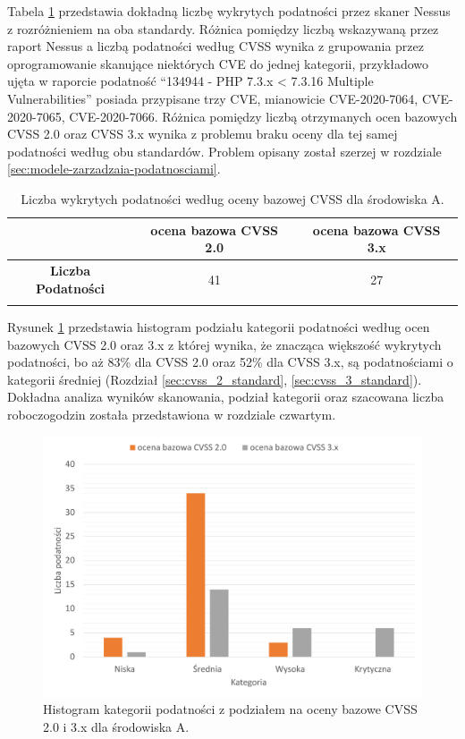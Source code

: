 \bigbreak
Tabela \ref{tab:chapter5:env_a:detected_vulns_nessus} przedstawia dokładną liczbę wykrytych podatności przez skaner Nessus z rozróżnieniem na oba standardy. Różnica pomiędzy liczbą wskazywaną przez raport Nessus a liczbą podatności według CVSS wynika z grupowania przez oprogramowanie skanujące niektórych CVE do jednej kategorii, przykładowo ujęta w raporcie podatność “134944 - PHP 7.3.x < 7.3.16 Multiple Vulnerabilities” posiada przypisane trzy CVE, mianowicie CVE-2020-7064, CVE-2020-7065, CVE-2020-7066. Różnica pomiędzy liczbą otrzymanych ocen bazowych CVSS 2.0 oraz CVSS 3.x wynika z problemu braku oceny dla tej samej podatności według obu standardów. Problem opisany został szerzej w rozdziale \ref{sec:modele-zarzadzaia-podatnosciami}.

\begin{table}[tbh]
\caption{Liczba wykrytych podatności według oceny bazowej CVSS dla środowiska A.}
\begin{center}
\label{tab:chapter5:env_a:detected_vulns_nessus}
\begin{tabular}{ccc}
\hline \noalign {\smallskip}
 & ocena bazowa CVSS 2.0 & ocena bazowa CVSS 3.x \\
\hline \noalign {\smallskip}
\textbf{Liczba Podatności}  &  41    & 27 \\
\hline \noalign {\smallskip}
\end{tabular}
\end{center}
\end{table}

\bigbreak
Rysunek \ref{fig:chapter5:env_a:env_stats} przedstawia histogram podziału kategorii podatności według ocen bazowych CVSS 2.0 oraz 3.x z której wynika, że znacząca większość wykrytych podatności, bo aż 83\% dla CVSS 2.0 oraz 52\% dla CVSS 3.x, są podatnościami o kategorii średniej (Rozdział \ref{sec:cvss_2_standard}, \ref{sec:cvss_3_standard}). Dokładna analiza wyników skanowania, podział kategorii oraz szacowana liczba roboczogodzin została przedstawiona w rozdziale czwartym.

\begin{figure}[!ht]
\centering
\includegraphics[width=.8\textwidth]{Chapters/Srodowiska/env_A/env_a_stats.pdf}
\caption{Histogram kategorii podatności z podziałem na oceny bazowe CVSS 2.0 i 3.x dla środowiska A.}
\label{fig:chapter5:env_a:env_stats}
\end{figure}


